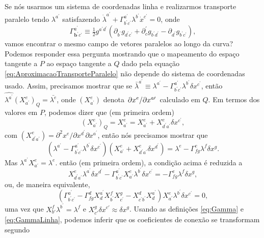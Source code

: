 Se nós usarmos um sistema de coordenadas linha e realizarmos transporte paralelo tendo $\lambda^{a^\prime}$ satisfazendo $\dot{\lambda}^{a^{\prime}}+\Gamma_{b^{\prime} c^{\prime}}^{a^{\prime}} \lambda^{b^{\prime}} \dot{x}^{c^{\prime}}=0$, onde
\begin{equation}\label{eq:GammaLinha}
	\Gamma_{\boldsymbol{b}^{\prime} c^{\prime}}^{a^{\prime}} \equiv \tfrac{1}{2} g^{a^{\prime} d^{\prime}}\left(\partial_{b^{\prime}} g_{d^{\prime} c^{\prime}}+\partial_{c}^{\prime} g_{b^{\prime} d^{\prime}}-\partial_{d^{\prime}} g_{b^{\prime} c^{\prime}}\right),
\end{equation}
vamos encontrar o mesmo campo de vetores paralelos ao longo da curva? Podemos responder essa pergunta mostrando que o mapeamento do espaço tangente a $P$ ao espaço tangente a $Q$ dado pela equação \eqref{eq:AproximacaoTransporteParalelo} não depende do sistema de coordenadas usado. Assim, precisamos mostrar que se $\bar{\lambda}^{a^{\prime}}\equiv \lambda^{a^\prime} - \Gamma_{b^{\prime} c^{\prime}}^{a^{\prime}} \lambda^{b^{\prime}} \delta x^{c^{\prime}}$, então $\hat{\lambda^{a^\prime}}(X^e_{a^\prime})_Q=\bar{\lambda^e}$, onde $(X^e_{a^\prime})$ denota $\pdv*{x^e}{x^{a\prime}}$ calculado em $Q$. Em termos dos valores em $P$, podemos dizer que (em primeira ordem)
\[
	(X^e_{a^\prime})_Q = X^e_{a^\prime} = X^e_{a^\prime}+X^e_{d^\prime a^\prime} \delta x^{c^\prime} ,
\]
com $(X^e_{d^\prime a^\prime})=\partial^2x^e/\partial x^{d^\prime}\partial x^{a^\prime}$, então nós precisamos mostrar que 
\[
	\left(\lambda^{a^{\prime}}-\Gamma_{b^{\prime} c^{\prime}}^{a^{\prime}} \lambda^{b^{\prime}} \delta x^{c^{\prime}}\right)\left(X_{a^{\prime}}^{e}+X_{d^{\prime} a^{\prime}}^{e} \delta x^{d^{\prime}}\right)=\lambda^{e}-\Gamma_{f g}^{e} \lambda^{f} \delta x^{g}.
\]
Mas $\lambda^{a^\prime}X^e_{a^\prime}=\lambda^e$. então (em primeira ordem), a condição acima é reduzida a
\[
	X_{d^{\prime} a^{\prime}}^{e} \lambda^{a^{\prime}} \delta x^{d^{\prime}}-\Gamma_{b^{\prime} c^{\prime}}^{a^{\prime}} X_{a^{\prime}}^{e} \lambda^{b^{\prime}} \delta x^{c^{\prime}}=-\Gamma_{f g}^{e} \lambda^{f} \delta x^{g} ,
\]
ou, de maneira equivalente,
\begin{equation}\label{eq:CondicaoIndependenciaCoordenada}
	\left(\Gamma_{b^{\prime} c^{\prime}}^{a^{\prime}}-\Gamma_{f g}^{d} X_{d}^{a^{\prime}} X_{b^{\prime}}^{f} X_{c^{\prime}}^{g}-X_{c^{\prime} b^{\prime}}^{d} X_{d}^{a^{\prime}}\right) X_{a^{\prime}}^{e} \lambda^{b^{\prime}} \delta x^{c^{\prime}}=0,
\end{equation}
uma vez que $X^f_{b'}\lambda^{b^\prime}=\lambda^f$ e $X^g_{c'}\delta x^{c'}\approx \delta x^g$. Usando as definições \eqref{eq:Gamma} e \eqref{eq:GammaLinha}, podemos inferir que os coeficientes de conexão se transformam segundo
